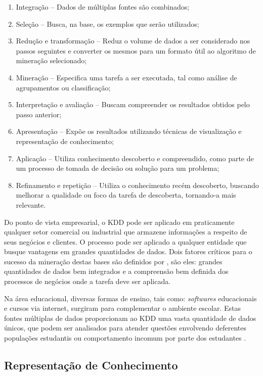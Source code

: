 \begin{enumerate}[label=\roman*.]
    \item Integração {--} Dados de múltiplas fontes são combinados;
    \item Seleção {--} Busca, na base, os exemplos que serão utilizados;
    \item Redução e transformação {--} Reduz o volume de dados a ser considerado nos passos seguintes e converter os mesmos para um formato útil ao algoritmo de mineração selecionado;
    \item Mineração {--} Especifica uma tarefa a ser executada, tal como análise de agrupamentos ou classificação;
    \item Interpretação e avaliação {--} Buscam compreender os resultados obtidos pelo passo anterior;
    \item Apresentação {--} Expõe os resultados utilizando técnicas de visualização e representação de conhecimento;
    \item Aplicação {--} Utiliza conhecimento descoberto e compreendido, como parte de um processo de tomada de decisão ou solução para um problema;
    \item Refinamento e repetição {--} Utiliza o conhecimento recém descoberto, buscando melhorar a qualidade ou foco da tarefa de descoberta, tornando\hyp{}a mais relevante.
\end{enumerate}

Do ponto de vista empresarial, o  KDD pode ser aplicado em praticamente qualquer setor comercial ou industrial que armazene informações a respeito de seus negócios e clientes. O processo pode ser aplicado a qualquer entidade que busque vantagens em grandes quantidades de dados. Dois fatores críticos para o sucesso da mineração destas bases são definidos por , são eles: grandes quantidades de dados bem integrados e a compreensão bem definida dos processos de negócios onde a tarefa deve ser aplicada.

Na área educacional, diversas formas de ensino, tais como: \textit{softwares} educacionais e cursos via internet, surgiram para complementar o ambiente escolar. Estas fontes múltiplas de dados proporcionam ao KDD uma vasta quantidade de dados únicos, que podem ser analisados para atender questões envolvendo deferentes populações estudantis ou comportamento incomum por parte dos estudantes \cite{romero2010handbook}.

\subsection{Representação de Conhecimento}
\label{subsec:representacao-conhecimento}

